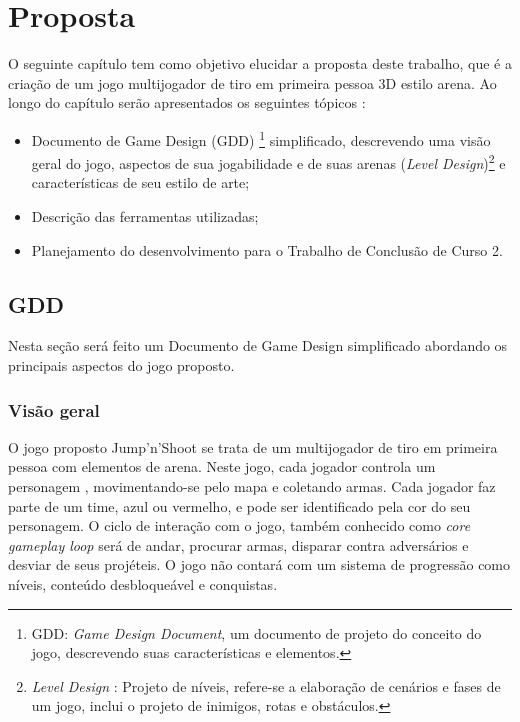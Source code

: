 \chapter{Proposta}
\label{cap:proposta}
O seguinte capítulo tem como objetivo elucidar a proposta deste trabalho, que é a criação de um jogo multijogador de tiro em 
primeira pessoa 3D estilo arena. Ao longo do capítulo serão apresentados os seguintes tópicos :
\begin{itemize}
    \item Documento de Game Design (GDD) \footnote{GDD: \textit{Game Design Document}, um documento de projeto do conceito do jogo, descrevendo suas características e elementos.} simplificado, descrevendo uma visão geral do jogo, aspectos de sua jogabilidade e de suas arenas (\textit{Level Design})\footnote{\textit{Level Design} : Projeto de níveis, refere-se a elaboração de cenários e fases de um jogo, inclui o projeto de inimigos, rotas e obstáculos.} e características de seu estilo de arte;
    \item Descrição das ferramentas utilizadas;
    \item Planejamento do desenvolvimento para o Trabalho de Conclusão de Curso 2.
\end{itemize}

\section{GDD }\label{sec:propostaGDD}

Nesta seção será feito um Documento de Game Design simplificado abordando os principais aspectos do jogo proposto.

\subsection{Visão geral}\label{subsec:GDDVisaoGeral}
O jogo proposto Jump'n'Shoot se trata de um multijogador de tiro em primeira pessoa com elementos de arena. Neste jogo, cada jogador controla um personagem , movimentando-se pelo mapa e coletando armas. Cada jogador faz parte de um time, azul ou vermelho, e pode ser identificado pela cor do seu personagem. O ciclo de interação com o jogo, também conhecido como \textit{core gameplay loop} será de andar, procurar armas, disparar contra adversários e desviar de seus projéteis. O jogo não contará com um sistema de progressão como níveis, conteúdo desbloqueável e conquistas.

